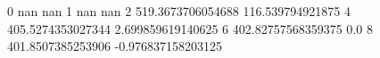 0 nan nan
1 nan nan
2 519.3673706054688 116.539794921875
4 405.5274353027344 2.699859619140625
6 402.82757568359375 0.0
8 401.8507385253906 -0.976837158203125
